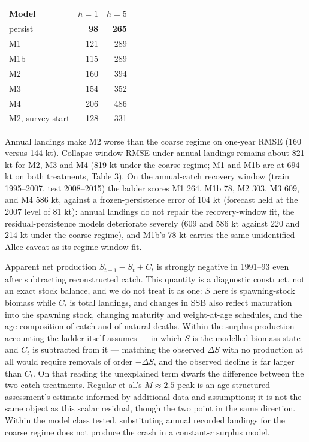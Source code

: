 \documentclass[11pt]{article}
\begin{document}
\begin{longtable}[]{@{}lrr@{}}
\toprule\noalign{}
Model & \(h=1\) & \(h=5\) \\
\midrule\noalign{}
\endhead
\bottomrule\noalign{}
\endlastfoot
persist & \textbf{98} & \textbf{265} \\
M1 & 121 & 289 \\
M1b & 115 & 289 \\
M2 & 160 & 394 \\
M3 & 154 & 352 \\
M4 & 206 & 486 \\
M2, survey start & 128 & 331 \\
\end{longtable}

Annual landings make M2 worse than the coarse regime on one-year RMSE
(160 versus 144 kt). Collapse-window RMSE under annual landings remains
about 821 kt for M2, M3 and M4 (819 kt under the coarse regime; M1 and
M1b are at 694 kt on both treatments, Table 3). On the
annual-catch recovery window (train 1995--2007, test 2008--2015) the
ladder scores M1 264, M1b 78, M2 303, M3 609, and M4 586 kt, against a
frozen-persistence error of 104 kt (forecast held at the 2007 level of
81 kt): annual landings do not repair the recovery-window fit, the
residual-persistence models deteriorate severely (609 and 586 kt against
220 and 214 kt under the coarse regime), and M1b's 78 kt carries the
same unidentified-Allee caveat as its regime-window fit.

Apparent net production \(S_{t+1}-S_t+C_t\) is strongly negative in
1991--93 even after subtracting reconstructed catch. This quantity is a
diagnostic construct, not an exact stock balance, and we do not treat it
as one: \(S\) here is spawning-stock biomass while \(C_t\) is total
landings, and changes in SSB also reflect maturation into the spawning
stock, changing maturity and weight-at-age schedules, and the age
composition of catch and of natural deaths. Within the surplus-production
accounting the ladder itself assumes --- in which \(S\) is the modelled
biomass state and \(C_t\) is subtracted from it --- matching the observed
\(\Delta S\) with no production at all would require removals of order
\(-\Delta S\), and the observed decline is far larger than \(C_t\). On
that reading the unexplained term dwarfs the difference between the two
catch treatments.
Regular et al.'s \(M \approx 2.5\) peak is an age-structured assessment's
estimate informed by additional data and assumptions; it is not the same
object as this scalar residual, though the two point in the same
direction. Within the model class tested, substituting annual recorded landings
for the coarse regime does not produce the crash in a constant-\(r\)
surplus model.
\end{document}
